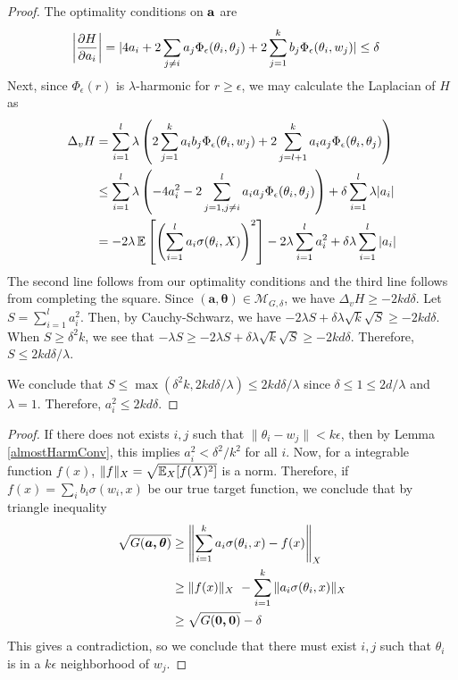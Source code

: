 \begin{proof}
The optimality conditions on ${\bf a}$ are 
\begin{align*}
   \left| \frac{\partial H}{\partial a_i} \right| & = \lvert 4a_i  + 2\sum_{j\neq i} a_j \Phi_\epsilon(\theta_i,\theta_j) + 2\sum_{j=1}^k b_j \Phi_\epsilon(\theta_i,w_j) \rvert \leq \delta
\end{align*}
%
Next, since $\Phi_\epsilon(r)$ is $\lambda$-harmonic for $r \geq \epsilon$, we may calculate the Laplacian of $H$ as
%
\begin{align*}
\Delta_v H & = \sum_{i=1}^l \lambda \left(2\sum_{j=1}^k a_ib_j
  \Phi_\epsilon(\theta_i, w_j) + 2\sum_{j=l+1}^k a_ia_j
  \Phi_\epsilon(\theta_i, \theta_j)\right) \\
& \leq \sum_{i=1}^l \lambda \left(-4 a_i^2 - 2
  \sum_{j = 1, j\neq i}^l  a_ia_j \Phi_\epsilon(\theta_i,\theta_j)\right)+ \delta \sum_{i=1}^l \lambda |a_i| \\
&= -2\lambda\operatorname*{\mathbb{E}}\left[\left( \sum_{i=1}^l a_i \sigma(\theta_i,X)\right)^2\right] -2\lambda \sum_{i=1}^l a_i^2+ \delta\lambda\sum_{i=1}^l  |a_i| \\
\end{align*} 
%
The second line follows from our optimality conditions and the third line follows from completing the square. Since $\boldsymbol{(a,\theta)} \in \mathcal{M}_{G,\delta}$, we have $\Delta_v H \geq - 2kd\delta$. Let $S = \sum_{i=1}^l a_i^2$. Then, by Cauchy-Schwarz, we have $-2 \lambda S + \delta\lambda\sqrt{k} \sqrt{S} \geq -2kd\delta$. When $S \geq \delta^2 k$, we see that $-\lambda S \geq -2 \lambda S + \delta\lambda \sqrt{k}\sqrt{S} \geq -2kd\delta$. Therefore, $S \leq 2kd\delta/\lambda$.
 
We conclude that $S \leq \max(\delta^2k, 2kd\delta/\lambda) \leq 2kd\delta/\lambda$ since $\delta\leq 1 \leq 2d/\lambda$ and $\lambda = 1$. Therefore, $a_i^2 \leq 2kd\delta$.

\end{proof}

\AlmostHarmRes*

 \begin{proof}
 If there does not exists $i, j$ such that
   $\|\theta_i - w_j\| <k\epsilon$, then by Lemma \ref{almostHarmConv}, this implies $a_i^2 < \delta^2/k^2$ for all $i$. Now, for a integrable
   function $f(x)$, $\| f\|_X = \sqrt{\operatorname*{\mathbb{E}}_X[f(X)^2]}$ is a
   norm. Therefore, if $f(x) = \sum_i b_i \sigma(w_i,x)$ be our true
   target function, we conclude that by triangle inequality
\begin{align*}
\sqrt{G(\boldsymbol{a,\theta})}  & \geq \left\lVert \sum_{i=1}^k a_i \sigma(\theta_i,x) - f(x) \right\rVert_X \\
&\geq \|f(x)\|_X\ - \sum_{i=1}^k \|a_i\sigma(\theta_i,x) \|_X \\
& \geq
  \sqrt{G(\boldsymbol{0,0})} - \delta
\end{align*}
This gives a contradiction, so we conclude that there must exist $i, j$ such that $\theta_i$ is in a $k\epsilon$ neighborhood of $w_j$.
 \end{proof}
 

